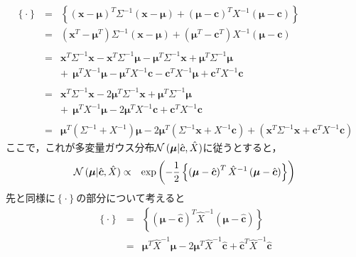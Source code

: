 \documentclass[a4j]{jarticle}
\begin{document}
\begin{eqnarray}
\left\{ \cdot \right\}
&=&
\left\{ \left( \boldsymbol{x} - \boldsymbol{\mu}\right)^T \Sigma^{-1} \left( \boldsymbol{x} - \boldsymbol{\mu}\right) + \left( \boldsymbol{\mu} - \boldsymbol{c}\right)^T X^{-1} \left( \boldsymbol{\mu} - \boldsymbol{c}\right) \right\} \\
&=&
\left( \boldsymbol{x}^T - \boldsymbol{\mu}^T \right) \Sigma^{-1} \left( \boldsymbol{x} - \boldsymbol{\mu}\right) + \left( \boldsymbol{\mu}^T - \boldsymbol{c}^T\right) X^{-1} \left( \boldsymbol{\mu} - \boldsymbol{c}\right) \\
&&\nonumber\\
&=&
\boldsymbol{x}^T \Sigma^{-1}\boldsymbol{x} -\boldsymbol{x}^T \Sigma^{-1}\boldsymbol{\mu} - \boldsymbol{\mu}^T \Sigma^{-1} \boldsymbol{x} + \boldsymbol{\mu}^T \Sigma^{-1} \boldsymbol{\mu} \nonumber\\
&& +~~\boldsymbol{\mu}^T X^{-1}\boldsymbol{\mu} -\boldsymbol{\mu}^T X^{-1}\boldsymbol{c} - \boldsymbol{c}^T X^{-1} \boldsymbol{\mu} + \boldsymbol{c}^T X^{-1} \boldsymbol{c}\\
&&\nonumber\\
&=&
\boldsymbol{x}^T \Sigma^{-1}\boldsymbol{x} -2\boldsymbol{\mu}^T \Sigma^{-1}\boldsymbol{x}  + \boldsymbol{\mu}^T \Sigma^{-1} \boldsymbol{\mu} \nonumber\\
&&+~~\boldsymbol{\mu}^T X^{-1}\boldsymbol{\mu} -2\boldsymbol{\mu}^T X^{-1}\boldsymbol{c} + \boldsymbol{c}^T X^{-1} \boldsymbol{c}\\
&&\nonumber\\
&=&
\boldsymbol{\mu}^T \left(\Sigma^{-1} + X^{-1}\right)\boldsymbol{\mu} -2\boldsymbol{\mu}^T \left(\Sigma^{-1}\boldsymbol{x} + X^{-1}\boldsymbol{c} \right) + \left( \boldsymbol{x}^T \Sigma^{-1}\boldsymbol{x} + \boldsymbol{c}^T X^{-1} \boldsymbol{c} \right)
\end{eqnarray}
ここで，これが多変量ガウス分布$\operatorname{\mathcal{N}}{(\boldsymbol{\mu} | \hat{\boldsymbol{c}} , \hat{X})}$に従うとすると，
\begin{eqnarray}
\operatorname{\mathcal{N}}{(\boldsymbol{\mu} | \hat{\boldsymbol{c}} , \hat{X})}
&\propto&
\exp{\left( -\frac{1}{2} \left\{ \left( \boldsymbol{\mu} - \hat{\boldsymbol{c}}\right)^T \hat{X}^{-1} \left( \boldsymbol{\mu} - \hat{\boldsymbol{c}}\right) \right\} \right)}
\end{eqnarray}
先と同様に$\left\{\cdot\right\}$の部分について考えると
\begin{eqnarray}
\left\{\cdot\right\} &=& \left\{ \left( \boldsymbol{\mu} - \hat{\boldsymbol{c}}\right)^T \hat{X}^{-1} \left( \boldsymbol{\mu} - \hat{\boldsymbol{c}}\right) \right\} \\
&=&
\boldsymbol{\mu}^T \hat{X}^{-1}\boldsymbol{\mu} -2\boldsymbol{\mu}^T \hat{X}^{-1}\hat{\boldsymbol{c}} + \hat{\boldsymbol{c}}^T \hat{X}^{-1} \hat{\boldsymbol{c}}
\end{eqnarray}
\end{document}
